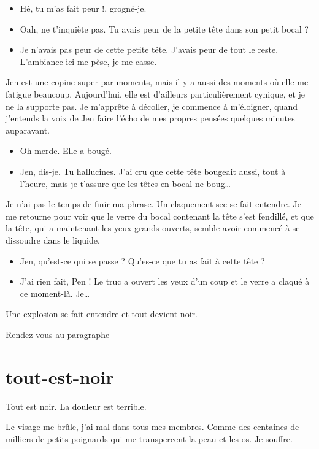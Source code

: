 \begin{itemize}
\item Hé, tu m'as fait peur !, grogné-je.
\item Oah, ne t'inquiète pas. Tu avais peur de la petite tête dans son petit bocal ?
\item Je n'avais pas peur de cette petite tête. J'avais peur de tout le reste. L'ambiance ici me pèse, je me casse.
\end{itemize}

Jen est une copine super par moments, mais il y a aussi des moments où elle me fatigue beaucoup. Aujourd'hui, elle est d'ailleurs particulièrement cynique, et je ne la supporte pas. Je m'apprête à décoller, je commence à m'éloigner, quand j'entends la voix de Jen faire l'écho de mes propres pensées quelques minutes auparavant.

\begin{itemize}
\item Oh merde. Elle a bougé.
\item Jen, dis-je. Tu hallucines. J'ai cru que cette tête bougeait aussi, tout à l'heure, mais je t'assure que les têtes en bocal ne boug…
\end{itemize}

Je n'ai pas le temps de finir ma phrase. Un claquement sec se fait entendre. Je me retourne pour voir que le verre du bocal contenant la tête s'est fendillé, et que la tête, qui a maintenant les yeux grands ouverts, semble avoir commencé à se dissoudre dans le liquide.

\begin{itemize}
\item Jen, qu'est-ce qui se passe ? Qu'es-ce que tu as fait à cette tête ?
\item J'ai rien fait, Pen ! Le truc a ouvert les yeux d'un coup et le verre a claqué à ce moment-là. Je…
\end{itemize}

Une explosion se fait entendre et tout devient noir.

\item Rendez-vous au paragraphe 
\enw

\section{tout-est-noir}

Tout est noir. La douleur est terrible.

Le visage me brûle, j'ai mal dans tous mes membres. Comme des centaines de milliers de petits poignards qui me transpercent la peau et les os. Je souffre.

